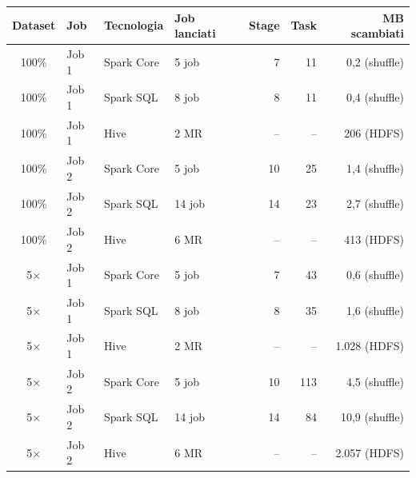 \begin{tabular}{@{}c l l l r r r@{}}
\toprule
Dataset & Job & Tecnologia & Job lanciati & Stage & Task & MB scambiati \\
\midrule
100\% & Job 1 & Spark Core & 5 job & 7 & 11 & 0,2 (shuffle) \\
100\% & Job 1 & Spark SQL & 8 job & 8 & 11 & 0,4 (shuffle) \\
100\% & Job 1 & Hive & 2 MR & -- & -- & 206 (HDFS) \\
\midrule
100\% & Job 2 & Spark Core & 5 job & 10 & 25 & 1,4 (shuffle) \\
100\% & Job 2 & Spark SQL & 14 job & 14 & 23 & 2,7 (shuffle) \\
100\% & Job 2 & Hive & 6 MR & -- & -- & 413 (HDFS) \\
\midrule
5× & Job 1 & Spark Core & 5 job & 7 & 43 & 0,6 (shuffle) \\
5× & Job 1 & Spark SQL & 8 job & 8 & 35 & 1,6 (shuffle) \\
5× & Job 1 & Hive & 2 MR & -- & -- & 1.028 (HDFS) \\
\midrule
5× & Job 2 & Spark Core & 5 job & 10 & 113 & 4,5 (shuffle) \\
5× & Job 2 & Spark SQL & 14 job & 14 & 84 & 10,9 (shuffle) \\
5× & Job 2 & Hive & 6 MR & -- & -- & 2.057 (HDFS) \\
\bottomrule
\end{tabular}